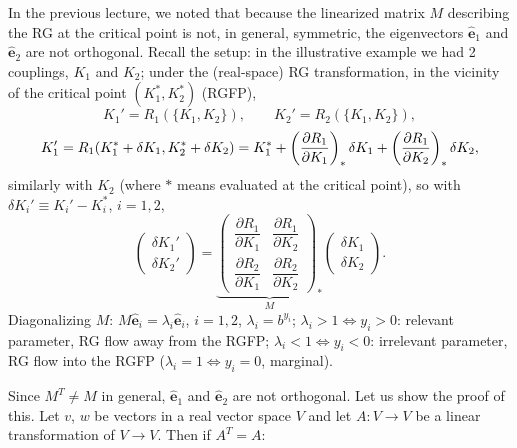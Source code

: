 
In the previous lecture, we noted that because the linearized matrix $M$ describing the RG at the critical
point is not, in general, symmetric, the eigenvectors $\hat{\mathbf e}_1$ and $\hat{\mathbf e}_2$ are not
orthogonal. Recall the setup: in the illustrative example we had 2 couplings, $K_1$ and $K_2$; under the
(real-space) RG transformation, in the vicinity of the critical point $(K_1^*,K_2^*)$ (RGFP),
\begin{equation}
  K_1' = R_1(\{K_1,K_2\}),\qquad K_2' = R_2(\{K_1,K_2\}),
\end{equation}
\begin{equation}
  K_1' = R_1(K_1^*+\delta K_1,K_2^*+\delta K_2) = K_1^* + \left(\frac{\partial R_1}{\partial K_1}\right)_*\delta K_1 + \left(\frac{\partial R_1}{\partial K_2}\right)_*\delta K_2,
\end{equation}
similarly with $K_2$ (where $*$ means evaluated at the critical point), so with
$\delta K_i'\equiv K_i'-K_i^*$, $i = 1,2$,
\begin{equation}
  \begin{pmatrix}\delta K_1'\\ \delta K_2'\end{pmatrix}
  = \underbrace{\begin{pmatrix}\dfrac{\partial R_1}{\partial K_1} & \dfrac{\partial R_1}{\partial K_2}\\[6pt] \dfrac{\partial R_2}{\partial K_1} & \dfrac{\partial R_2}{\partial K_2}\end{pmatrix}_*}_{M}
    \begin{pmatrix}\delta K_1\\ \delta K_2\end{pmatrix}.
\end{equation}
Diagonalizing $M$: $M\hat{\mathbf e}_i = \lambda_i\hat{\mathbf e}_i$, $i = 1,2$, $\lambda_i = b^{y_i}$;
$\lambda_i>1\Leftrightarrow y_i>0$: relevant parameter, RG flow away from the RGFP;
$\lambda_i<1\Leftrightarrow y_i<0$: irrelevant parameter, RG flow into the RGFP
($\lambda_i = 1\Leftrightarrow y_i = 0$, marginal).

Since $M^T\ne M$ in general, $\hat{\mathbf e}_1$ and $\hat{\mathbf e}_2$ are not orthogonal. Let us show the
proof of this. Let $v$, $w$ be vectors in a real vector space $V$ and let $A:V\to V$ be a linear
transformation of $V\to V$. Then if $A^T = A$:

